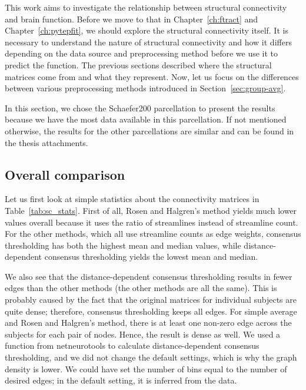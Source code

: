 This work aims to investigate the relationship between structural connectivity and brain function. Before we move to that in Chapter~\ref{ch:ftract} and Chapter~\ref{ch:pytepfit}, we should explore the structural connectivity itself. It is necessary to understand the nature of structural connectivity and how it differs depending on the data source and preprocessing method before we use it to predict the function. The previous sections described where the structural matrices come from and what they represent. Now, let us focus on the differences between various preprocessing methods introduced in Section~\ref{sec:group-avg}.

In this section, we chose the Schaefer200 parcellation to present the results because we have the most data available in this parcellation. If not mentioned otherwise, the results for the other parcellations are similar and can be found in the thesis attachments. \TODO

\subsection{Overall comparison}


Let us first look at simple statistics about the connectivity matrices in Table~\ref{tab:sc_stats}. First of all, Rosen and Halgren's method yields much lower values overall because it uses the ratio of streamlines instead of streamline count. For the other methods, which all use streamline counts as edge weights, consensus thresholding has both the highest mean and median values, while distance-dependent consensus thresholding yields the lowest mean and median.

We also see that the distance-dependent consensus thresholding results in fewer edges than the other methods (the other methods are all the same). This is probably caused by the fact that the original matrices for individual subjects are quite dense; therefore, consensus thresholding keeps all edges. For simple average and Rosen and Halgren's method, there is at least one non-zero edge across the subjects for each pair of nodes. Hence, the result is dense as well. We used a function from netneurotools to calculate distance-dependent consensus thresholding, and we did not change the default settings, which is why the graph density is lower. We could have set the number of bins equal to the number of desired edges; in the default setting, it is inferred from the data.

